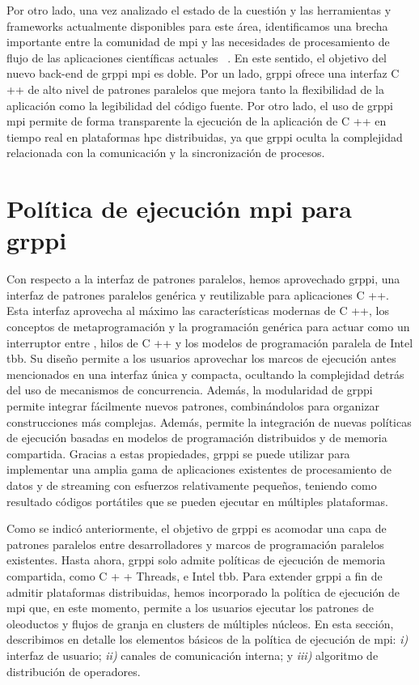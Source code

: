 Por otro lado, una vez analizado el estado de la cuestión y las herramientas y frameworks actualmente disponibles para este área, identificamos una brecha importante entre la comunidad de \acrshort{mpi} y las necesidades de procesamiento de flujo de las aplicaciones científicas actuales ~\cite{stream2016}. En este sentido, el objetivo del nuevo back-end de \acrshort{grppi} \acrshort{mpi} es doble. Por un lado, \acrshort{grppi} ofrece una interfaz C ++ de alto nivel de patrones paralelos que mejora tanto la flexibilidad de la aplicación como la legibilidad del código fuente. Por otro lado, el uso de \acrshort{grppi} \acrshort{mpi} permite de forma transparente la ejecución de la aplicación de C ++ en tiempo real en plataformas \acrshort{hpc} distribuidas, ya que \acrshort{grppi} oculta la complejidad relacionada con la comunicación y la sincronización de procesos.

\section{Política de ejecución \acrshort{mpi} para \acrshort{grppi}}
\label{sec:politica_ejecucion_mpi}

Con respecto a la interfaz de patrones paralelos, hemos aprovechado \acrshort{grppi}, una interfaz de patrones paralelos genérica y reutilizable para aplicaciones C ++. Esta interfaz aprovecha al máximo las características modernas de C ++, los conceptos de metaprogramación y la programación genérica para actuar como un interruptor entre , hilos de C ++ y los modelos de programación paralela de Intel \acrshort{tbb}.  Su diseño permite a los usuarios aprovechar los marcos de ejecución antes mencionados en una interfaz única y compacta, ocultando la complejidad detrás del uso de mecanismos de concurrencia. Además, la modularidad de \acrshort{grppi} permite integrar fácilmente nuevos patrones, combinándolos para organizar construcciones más complejas. Además, permite la integración de nuevas políticas de ejecución basadas en modelos de programación distribuidos y de memoria compartida. Gracias a estas propiedades, \acrshort{grppi} se puede utilizar para implementar una amplia gama de aplicaciones existentes de procesamiento de datos y de streaming con esfuerzos relativamente pequeños, teniendo como resultado códigos portátiles que se pueden ejecutar en múltiples plataformas.

Como se indicó anteriormente, el objetivo de \acrshort{grppi} es acomodar una capa de patrones paralelos entre desarrolladores y marcos de programación paralelos existentes. Hasta ahora, \acrshort{grppi} solo admite políticas de ejecución de memoria compartida, como C + + Threads, e Intel \acrshort{tbb}. Para extender \acrshort{grppi} a fin de admitir plataformas distribuidas, hemos incorporado la política de ejecución de \acrshort{mpi} que, en este momento, permite a los usuarios ejecutar los patrones de oleoductos y flujos de granja en clusters de múltiples núcleos. En esta sección, describimos en detalle los elementos básicos de la política de ejecución de \acrshort{mpi}: \emph{i)} interfaz de usuario; \emph{ii)} canales de comunicación interna; y \emph{iii)} algoritmo de distribución de operadores.

